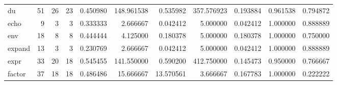 \begin{tabular}{lrrrrrrrrrr}
du        &                                      51 &                 26 &                                23 &                                   0.450980 &                             148.961538 &                                     0.535982 &                        357.576923 &                                0.193884 &                           0.961538 &                                           0.794872 \\
echo      &                                       9 &                  3 &                                 3 &                                   0.333333 &                               2.666667 &                                     0.042412 &                          5.000000 &                                0.042412 &                           1.000000 &                                           0.888889 \\
env       &                                      18 &                  8 &                                 8 &                                   0.444444 &                               4.125000 &                                     0.180378 &                          5.000000 &                                0.180378 &                           1.000000 &                                           0.750000 \\
expand    &                                      13 &                  3 &                                 3 &                                   0.230769 &                               2.666667 &                                     0.042412 &                          5.000000 &                                0.042412 &                           1.000000 &                                           0.888889 \\
expr      &                                      33 &                 20 &                                18 &                                   0.545455 &                             141.550000 &                                     0.590200 &                        412.750000 &                                0.145473 &                           0.950000 &                                           0.766667 \\
factor    &                                      37 &                 18 &                                18 &                                   0.486486 &                              15.666667 &                                    13.570561 &                          3.666667 &                                0.167783 &                           1.000000 &                                           0.222222 \\

\end{tabular}
